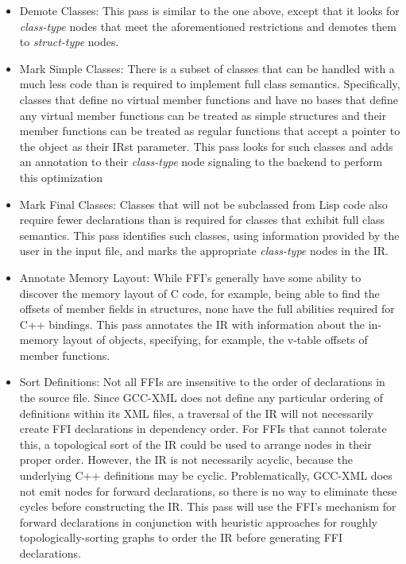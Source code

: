 \documentclass[12pt]{article}
\begin{document}
\begin{itemize}
\item Demote Classes: This pass is similar to the one above, except that it looks for \emph{class-type} nodes that meet the aforementioned restrictions and demotes them to \emph{struct-type} nodes. 
\item Mark Simple Classes: There is a subset of classes that can be handled with a much less code than is required to implement full class semantics. Specifically, classes that define no virtual member functions and have no bases that define any virtual member functions can be treated as simple structures and their member functions can be treated as regular functions that accept a pointer to the object as their IRst parameter. This pass looks for such classes and adds an annotation to their \emph{class-type} node signaling to the backend to perform this optimization
\item Mark Final Classes: Classes that will not be subclassed from Lisp code also require fewer declarations than is required for classes that exhibit full class semantics. This pass identifies such classes, using information provided by the user in the input file, and marks the appropriate \emph{class-type} nodes in the IR.
\item Annotate Memory Layout: While FFI's generally have some ability to discover the memory layout of C code, for example, being able to find the offsets of member fields in structures, none have the full abilities required for C++ bindings. This pass annotates the IR with information about the in-memory layout of objects, specifying, for example, the v-table offsets of member functions. 
\item Sort Definitions: Not all FFIs are insensitive to the order of declarations in the source file. Since GCC-XML does not define any particular ordering of definitions within its XML files, a traversal of the IR will not necessarily create FFI declarations in dependency order. For FFIs that cannot tolerate this, a topological sort of the IR could be used to arrange nodes in their proper order. However, the IR is not necessarily acyclic, because the underlying C++ definitions may be cyclic. Problematically, GCC-XML does not emit nodes for forward declarations, so there is no way to eliminate these cycles before constructing the IR. This pass will use the FFI's mechanism for forward declarations in conjunction with heuristic approaches for roughly topologically-sorting graphs to order the IR before generating FFI declarations. 
\end{itemize}
\end{document}
